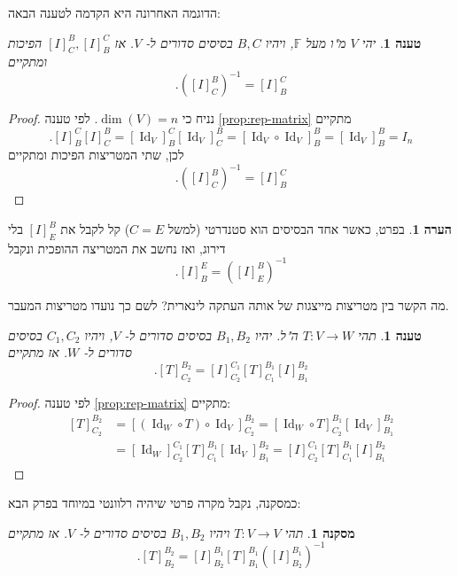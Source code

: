 \documentclass[12pt]{report}
\theoremstyle{plain}
\newtheorem{proposition}[theorem]{טענה}
\newtheorem{corollary}[theorem]{מסקנה}
\theoremstyle{definition}
\newtheorem{remark}{הערה}[chapter]
\newcommand{\F}{\mathbb{F}}
\newcommand{\0}{\mathbf{0}}
\DeclareMathOperator{\Id}{Id}
\begin{document}
הדוגמה האחרונה היא הקדמה לטענה הבאה:

\begin{proposition}\label{prop:rep-inverse}
יהי
$V$
מ"ו מעל
$\F$,
ויהיו
$B,C$
בסיסים סדורים ל-
$V$.
אז 
$[I]_C^B,[I]_B^C$
הפיכות ומתקיים
$$
.([I]_C^B)^{-1}=[I]_B^C
$$
\end{proposition}

\begin{proof}
נניח כי
$\dim(V)=n$.
לפי טענה
\ref{prop:rep-matrix}
מתקיים
$$
.[I]_B^C[I]_C^B=[\Id_V]_B^C[\Id_V]_C^B=[\Id_V\circ\Id_V]_B^B=[\Id_V]_B^B=I_n
$$
לכן, שתי המטריצות הפיכות ומתקיים
$$
.([I]_C^B)^{-1}=[I]_B^C
$$

\end{proof}

\begin{remark}
בפרט, כאשר אחד הבסיסים הוא סטנדרטי (למשל
$C=E$)
קל לקבל את
$[I]_E^B$
בלי דירוג, ואז נחשב את המטריצה ההופכית ונקבל
$$
.[I]_B^E=([I]_E^B)^{-1}
$$
\end{remark}

מה הקשר בין מטריצות מייצגות של אותה העתקה לינארית? לשם כך נועדו מטריצות המעבר.

\begin{proposition}\label{prop:rep-transition}
תהי
$T:V\to W$
ה"ל. יהיו 
$B_1,B_2$
בסיסים סדורים ל-
$V$,
ויהיו
$C_1,C_2$
בסיסים סדורים ל-
$W$. 
אז מתקיים
$$
.[T]_{C_2}^{B_2}=[I]_{C_2}^{C_1}[T]_{C_1}^{B_1}[I]_{B_1}^{B_2}
$$
\end{proposition}

\begin{proof}
לפי טענה
\ref{prop:rep-matrix}
מתקיים:
$$
\begin{aligned}
[T]_{C_2}^{B_2}&=[(\Id_W\circ T)\circ \Id_V]_{C_2}^{B_2}=[\Id_W\circ T]_{C_2}^{B_1}[\Id_V]_{B_1}^{B_2} \\
&=[\Id_W]_{C_2}^{C_1}[T]_{C_1}^{B_1}[\Id_V]_{B_1}^{B_2}=[I]_{C_2}^{C_1}[T]_{C_1}^{B_1}[I]_{B_1}^{B_2}
\end{aligned}
$$
\end{proof}

כמסקנה, נקבל מקרה פרטי שיהיה רלוונטי במיוחד בפרק הבא:

\begin{corollary}\label{cor:rep-similar}
תהי
$T:V\to V$
ויהיו
$B_1,B_2$
בסיסים סדורים ל-
$V$.
אז מתקיים
$$
.[T]_{B_2}^{B_2}=[I]_{B_2}^{B_1}[T]_{B_1}^{B_1}([I]_{B_2}^{B_1})^{-1}
$$
\end{corollary}
\end{document}
